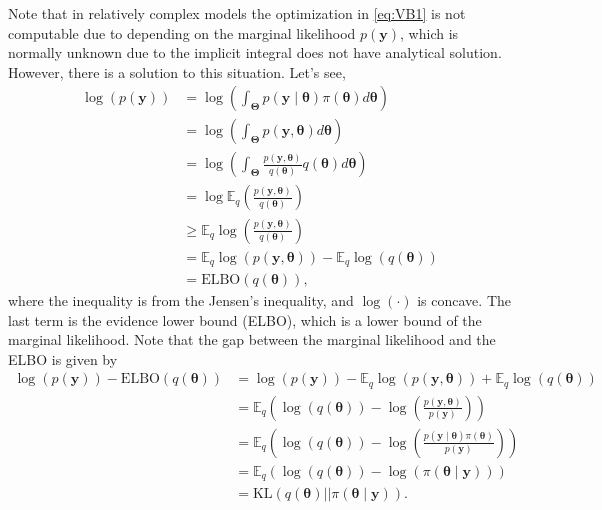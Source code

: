 Note that in relatively complex models the optimization in \ref{eq:VB1}  is not computable due to depending on the marginal likelihood $p(\boldsymbol{y})$, which is normally unknown due to the implicit integral does not have analytical solution. However, there is a solution to this situation. Let's see,
\begin{align*}
	\log(p(\boldsymbol{y}))&=\log\left(\int_{\boldsymbol{\Theta}}p(\boldsymbol{y}\mid \boldsymbol{\theta})\pi(\boldsymbol{\theta})d\boldsymbol{\theta}\right)\\
	&=\log\left(\int_{\boldsymbol{\Theta}}p(\boldsymbol{y}, \boldsymbol{\theta})d\boldsymbol{\theta}\right)\\
	&=\log\left(\int_{\boldsymbol{\Theta}}\frac{p(\boldsymbol{y}, \boldsymbol{\theta})}{q(\boldsymbol{\theta})}q(\boldsymbol{\theta})d\boldsymbol{\theta}\right)\\
	&=\log \mathbb{E}_q\left(\frac{p(\boldsymbol{y}, \boldsymbol{\theta})}{q(\boldsymbol{\theta})}\right)\\
	&\geq \mathbb{E}_q\log\left(\frac{p(\boldsymbol{y}, \boldsymbol{\theta})}{q(\boldsymbol{\theta})}\right)\\
	&=\mathbb{E}_q\log(p(\boldsymbol{y}, \boldsymbol{\theta}))-\mathbb{E}_q\log(q(\boldsymbol{\theta}))\\
	&=\text{ELBO}(q(\boldsymbol{\theta})),
\end{align*}
where the inequality is from the Jensen's inequality, and $\log(\cdot)$ is concave. The last term is the evidence lower bound (ELBO), which is a lower bound of the marginal likelihood.
Note that the gap between the marginal likelihood and the ELBO is given by
\begin{align*}
	\log(p(\boldsymbol{y})) - \text{ELBO}(q(\boldsymbol{\theta})) & = \log(p(\boldsymbol{y})) - \mathbb{E}_q\log(p(\boldsymbol{y}, \boldsymbol{\theta}))+\mathbb{E}_q\log(q(\boldsymbol{\theta}))\\
	&=\mathbb{E}_q\left(\log(q(\boldsymbol{\theta}))-\log\left(\frac{p(\boldsymbol{y}, \boldsymbol{\theta})}{p(\boldsymbol{y})}\right)\right)\\
	&=\mathbb{E}_q\left(\log(q(\boldsymbol{\theta}))-\log\left(\frac{p(\boldsymbol{y}\mid \boldsymbol{\theta})\pi( \boldsymbol{\theta})}{p(\boldsymbol{y})}\right)\right)\\
	&=\mathbb{E}_q\left(\log(q(\boldsymbol{\theta}))-\log(\pi(\boldsymbol{\theta}\mid \boldsymbol{y}))\right)\\
	&=\text{KL}(q(\boldsymbol{\theta})||\pi(\boldsymbol{\theta} \mid \mathbf{y})).	 
\end{align*}
